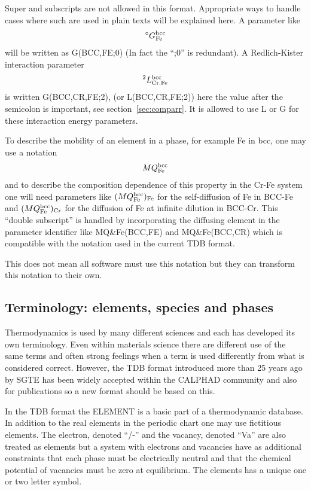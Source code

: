 \documentclass[12pt]{article}
\begin{document}
Super and subscripts are not allowed in this format.  Appropriate ways
to handle cases where such are used in plain texts will be explained
here.  A parameter like
\begin{eqnarray}
^{\circ}G^{\rm bcc}_{\rm Fe} \nonumber
\end{eqnarray}
will be written as G(BCC,FE;0) (In fact the ``;0'' is redundant).  A
Redlich-Kister interaction parameter
\begin{eqnarray}
^{2}L^{\rm bcc}_{\rm Cr.Fe} \nonumber
\end{eqnarray}
is written G(BCC,CR,FE;2), (or L(BCC,CR,FE;2)) here the value after
the semicolon is important, see section~\ref{sec:comparr}.  It is
allowed to use L or G for these interaction energy parameters.

To describe the mobility of an element in a phase, for example Fe in bcc,
one may use a notation
\begin{eqnarray}
MQ^{\rm bcc}_{\rm Fe} \nonumber
\end{eqnarray}
and to describe the composition dependence of this property in the
Cr-Fe system one will need parameters like $(MQ^{\rm bcc}_{\rm Fe})_{\rm Fe}$
for the self-diffusion of Fe in BCC-Fe and $(MQ^{\rm bcc}_{\rm Fe})_{\rm Cr}$
for the diffusion of Fe at infinite dilution
in BCC-Cr.  This ``double subscript'' is handled by incorporating the
diffusing element in the parameter identifier like MQ\&Fe(BCC,FE) and
MQ\&Fe(BCC,CR) which is compatible with the notation used in the
current TDB format.

This does not mean all software must use this notation but they can
transform this notation to their own.

\subsection{Terminology: elements, species and phases}

Thermodynamics is used by many different sciences and each has
developed its own terminology.  Even within materials science there
are different use of the same terms and often strong feelings when a
term is used differently from what is considered correct.  However,
the TDB format introduced more than 25 years ago by SGTE has been
widely accepted within the CALPHAD community and also for publications
so a new format should be based on this.

In the TDB format the ELEMENT is a basic part of a thermodynamic
database.  In addition to the real elements in the periodic chart one
may use fictitious elements.  The electron, denoted ``/-'' and the
vacancy, denoted ``Va'' are also treated as elements but a system with
electrons and vacancies have as additional constraints that each phase
must be electrically neutral and that the chemical potential of
vacancies must be zero at equilibrium.  The elements has a unique one
or two letter symbol.
\end{document}
